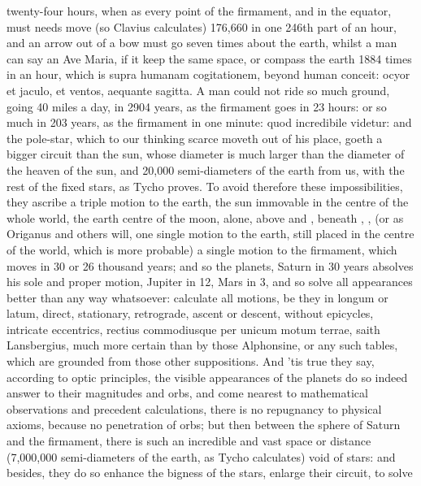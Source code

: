 {twenty-four hours, when as every point of the firmament, and in the
equator, must needs move (so Clavius calculates) 176,660 in one
246th part of an hour, and an arrow out of a bow must go seven times
about the earth, whilst a man can say an Ave Maria, if it keep the same
space, or compass the earth 1884 times in an hour, which is supra
humanam cogitationem, beyond human conceit: ocyor et jaculo, et ventos,
aequante sagitta. A man could not ride so much ground, going 40 miles a
day, in 2904 years, as the firmament goes in 23 hours: or so much in
203 years, as the firmament in one minute: quod incredibile videtur:
and the pole-star, which to our thinking scarce moveth out of his
place, goeth a bigger circuit than the sun, whose diameter is much
larger than the diameter of the heaven of the sun, and 20,000
semi-diameters of the earth from us, with the rest of the fixed stars,
as Tycho proves. To avoid therefore these impossibilities, they ascribe
a triple motion to the earth, the sun immovable in the centre of the
whole world, the earth centre of the moon, alone, above  and ,
beneath , ,  (or as Origanus and others will, one single
motion to the earth, still placed in the centre of the world, which is
more probable) a single motion to the firmament, which moves in 30 or
26 thousand years; and so the planets, Saturn in 30 years absolves his
sole and proper motion, Jupiter in 12, Mars in 3, \etc{} and so solve all
appearances better than any way whatsoever: calculate all motions, be
they in longum or latum, direct, stationary, retrograde, ascent or
descent, without epicycles, intricate eccentrics, \etc{} rectius
commodiusque per unicum motum terrae, saith Lansbergius, much more
certain than by those Alphonsine, or any such tables, which are
grounded from those other suppositions. And 'tis true they say,
according to optic principles, the visible appearances of the planets
do so indeed answer to their magnitudes and orbs, and come nearest to
mathematical observations and precedent calculations, there is no
repugnancy to physical axioms, because no penetration of orbs; but then
between the sphere of Saturn and the firmament, there is such an
incredible and vast space or distance (7,000,000 semi-diameters
of the earth, as Tycho calculates) void of stars: and besides, they do
so enhance the bigness of the stars, enlarge their circuit, to solve
}
